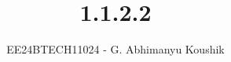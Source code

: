 \documentclass[journal]{IEEEtran}
\begin{document}

\vspace{3cm}

\title{1.1.2.2}
\author{EE24BTECH11024 - G. Abhimanyu Koushik}
{\let\newpage\relax\maketitle}

\renewcommand{\thefigure}{\theenumi}
\renewcommand{\thetable}{\theenumi}
\setlength{\intextsep}{10pt} %


\renewcommand{\thetable}{\theenumi}
\end{document}
